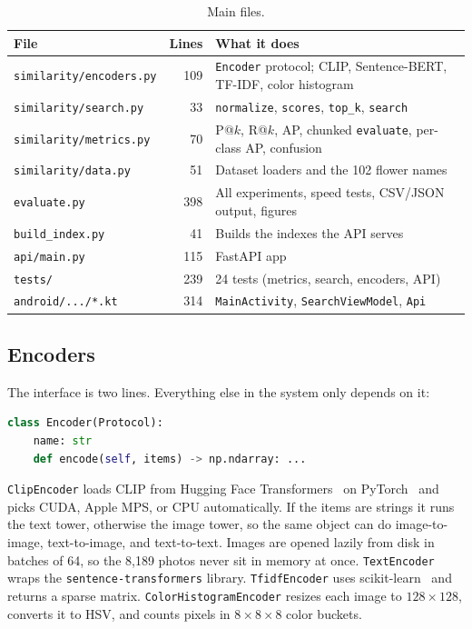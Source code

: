 \documentclass{article}
\begin{document}
\begin{table}[h]
\centering\small
\caption{Main files.}
\label{tab:files}
\begin{tabular}{@{}lrp{8.3cm}@{}}
\toprule
File & Lines & What it does \\
\midrule
\texttt{similarity/encoders.py} & 109 & \texttt{Encoder} protocol; CLIP, Sentence-BERT, TF-IDF, color histogram \\
\texttt{similarity/search.py} & 33 & \texttt{normalize}, \texttt{scores}, \texttt{top\_k}, \texttt{search} \\
\texttt{similarity/metrics.py} & 70 & P@$k$, R@$k$, AP, chunked \texttt{evaluate}, per-class AP, confusion \\
\texttt{similarity/data.py} & 51 & Dataset loaders and the 102 flower names \\
\texttt{evaluate.\allowbreak py} & 398 & All experiments, speed tests, CSV/JSON output, figures \\
\texttt{build\_index.py} & 41 & Builds the indexes the API serves \\
\texttt{api/main.py} & 115 & FastAPI app \\
\texttt{tests/} & 239 & 24 tests (metrics, search, encoders, API) \\
\texttt{android/.../*.kt} & 314 & \texttt{MainActivity}, \texttt{SearchViewModel}, \texttt{Api} \\
\bottomrule
\end{tabular}
\end{table}

\subsection{Encoders}

The interface is two lines. Everything else in the system only depends on it:
\begin{lstlisting}[language=Python]
class Encoder(Protocol):
    name: str
    def encode(self, items) -> np.ndarray: ...
\end{lstlisting}
\texttt{ClipEncoder} loads CLIP from Hugging Face Transformers~\cite{wolf2020transformers} on PyTorch~\cite{paszke2019pytorch} and picks CUDA, Apple MPS, or CPU automatically. If the items are strings it runs the text tower, otherwise the image tower, so the same object can do image-to-image, text-to-image, and text-to-text. Images are opened lazily from disk in batches of 64, so the 8,189 photos never sit in memory at once. \texttt{TextEncoder} wraps the \texttt{sentence-transformers} library. \texttt{TfidfEncoder} uses scikit-learn~\cite{pedregosa2011sklearn} and returns a sparse matrix. \texttt{ColorHistogramEncoder} resizes each image to $128\times128$, converts it to HSV, and counts pixels in $8\times8\times8$ color buckets.
\end{document}
